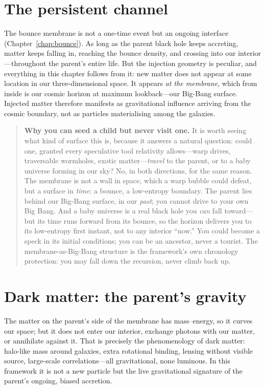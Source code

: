 \section{The persistent channel}
\label{sec:persistent-channel}

The bounce membrane is not a one-time event but an ongoing interface
(Chapter~\ref{chap:bounce}). As long as the parent black hole keeps accreting,
matter keeps falling in, reaching the bounce density, and crossing into our
interior---throughout the parent's entire life. But the injection geometry is
peculiar, and everything in this chapter follows from it: new matter does not
appear at some location in our three-dimensional space. It appears \emph{at the
membrane}, which from inside is our cosmic horizon at maximum lookback---our
Big-Bang surface. Injected matter therefore manifests as gravitational influence
arriving from the cosmic boundary, not as particles materialising among the
galaxies.

\begin{quote}\small
\textbf{Why you can seed a child but never visit one.} It is worth seeing what
kind of surface this is, because it answers a natural question: could one, granted
every speculative tool relativity allows---warp drives, traversable wormholes,
exotic matter---\emph{travel} to the parent, or to a baby universe forming in our
sky? No, in both directions, for the same reason. The membrane is not a wall in
space, which a warp bubble could defeat, but a surface in \emph{time}: a bounce, a
low-entropy boundary. The parent lies behind our Big-Bang surface, in our
\emph{past}; you cannot drive to your own Big Bang. And a baby universe is a real
black hole you \emph{can} fall toward---but its time runs forward from its bounce,
so the horizon delivers you to its low-entropy first instant, not to any interior
``now.'' You could become a speck in its initial conditions; you can be an
ancestor, never a tourist. The membrane-as-Big-Bang structure is the framework's
own chronology protection: you may fall down the recursion, never climb back up.
\end{quote}

\section{Dark matter: the parent's gravity}
\label{sec:dark-matter}

The matter on the parent's side of the membrane has mass--energy, so it curves our
space; but it does not enter our interior, exchange photons with our matter, or
annihilate against it. That is precisely the phenomenology of dark matter:
halo-like mass around galaxies, extra rotational binding, lensing without visible
source, large-scale correlations---all gravitational, none luminous. In this
framework it is not a new particle but the live gravitational signature of the
parent's ongoing, biased accretion.

